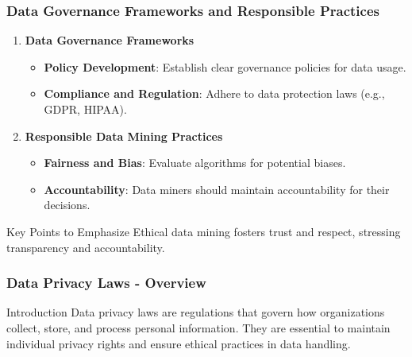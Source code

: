\documentclass[aspectratio=169]{beamer}
\begin{document}
\begin{frame}[fragile]
    \frametitle{Data Governance Frameworks and Responsible Practices}
    \begin{enumerate}
        \item \textbf{Data Governance Frameworks}
        \begin{itemize}
            \item \textbf{Policy Development}: Establish clear governance policies for data usage.
            \item \textbf{Compliance and Regulation}: Adhere to data protection laws (e.g., GDPR, HIPAA).
        \end{itemize}

        \item \textbf{Responsible Data Mining Practices}
        \begin{itemize}
            \item \textbf{Fairness and Bias}: Evaluate algorithms for potential biases.
            \item \textbf{Accountability}: Data miners should maintain accountability for their decisions.
        \end{itemize}
    \end{enumerate}

    \begin{block}{Key Points to Emphasize}
        Ethical data mining fosters trust and respect, stressing transparency and accountability.
    \end{block}
\end{frame}

\begin{frame}[fragile]
    \frametitle{Data Privacy Laws - Overview}
    \begin{block}{Introduction}
        Data privacy laws are regulations that govern how organizations collect, store, and process personal information. They are essential to maintain individual privacy rights and ensure ethical practices in data handling.
    \end{block}
\end{frame}
\end{document}
